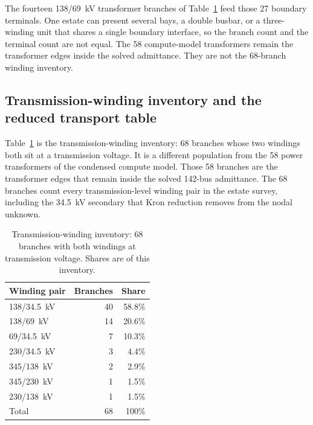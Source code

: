 The fourteen 138/69~kV transformer branches of Table~\ref{tab:cuadro51} feed those 27 boundary terminals. One estate can present several bays, a double busbar, or a three-winding unit that shares a single boundary interface, so the branch count and the terminal count are not equal. The 58 compute-model transformers remain the transformer edges inside the solved admittance. They are not the 68-branch winding inventory.

\subsection{Transmission-winding inventory and the reduced transport table}
\label{sub:inventory}

Table~\ref{tab:cuadro51} is the transmission-winding inventory: 68 branches whose two windings both sit at a transmission voltage. It is a different population from the 58 power transformers of the condensed compute model. Those 58 branches are the transformer edges that remain inside the solved 142-bus admittance. The 68 branches count every transmission-level winding pair in the estate survey, including the 34.5~kV secondary that Kron reduction removes from the nodal unknown.

\begin{table}[!t]
\centering
\caption{Transmission-winding inventory: 68 branches with both windings at transmission voltage. Shares are of this inventory.}
\label{tab:cuadro51}
\begin{tabular}{lrr}
\toprule
Winding pair & Branches & Share \\
\midrule
138/34.5~kV & 40 & 58.8\% \\
138/69~kV & 14 & 20.6\% \\
69/34.5~kV & 7 & 10.3\% \\
230/34.5~kV & 3 & 4.4\% \\
345/138~kV & 2 & 2.9\% \\
345/230~kV & 1 & 1.5\% \\
230/138~kV & 1 & 1.5\% \\
\midrule
Total & 68 & 100\% \\
\bottomrule
\end{tabular}
\end{table}

